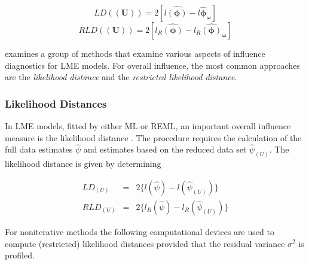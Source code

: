 \documentclass[12pt, a4paper]{report}
\theoremstyle{plain}
\theoremstyle{definition}
\theoremstyle{remark}
\begin{document}
	
	\[  LD(\boldsymbol{(U)})= 2[l\boldsymbol{\hat{(\phi)}} - l\boldsymbol{\hat{\phi}_\omega} ] \]
	\[  RLD(\boldsymbol{(U)})= 2[ l_R\boldsymbol{\hat{(\phi)}} - l_R\boldsymbol{\hat{(\phi)}_\omega} ] \]
	
	\citet{west} examines a group of methods that examine various aspects of influence diagnostics for LME models.
	For overall influence, the most common approaches are the \textit{likelihood distance} and the \textit{restricted likelihood distance}.
	
	
	
	
	
	

	
	
	
	\subsubsection{Likelihood Distances}
	
	In LME models, fitted by either ML or REML, an important overall
	influence measure is the likelihood distance \citep{cook82}. The
	procedure requires the calculation of the full data estimates
	$\hat{\psi}$ and estimates based on the reduced data set
	$\hat{\psi}_{(U)}$. The likelihood distance is given by
	determining
	
	
	\begin{eqnarray}
	LD_{(U)} &=& 2\{l(\hat{\psi}) - l( \hat{\psi}_{(U)}) \}\\
	RLD_{(U)} &=& 2\{l_{R}(\hat{\psi}) - l_{R}(\hat{\psi}_{(U)})\}
	\end{eqnarray}
	
	
	
	
	For noniterative methods the following computational devices are used to compute (restricted) likelihood distances provided that the residual variance
	$\sigma^2$ is profiled.
	
\end{document}
